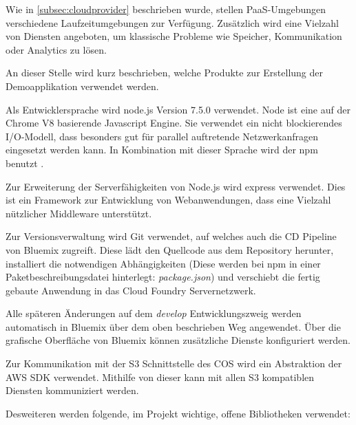Wie in \autoref{subsec:cloudprovider} beschrieben wurde, stellen \acs{PaaS}-Umgebungen verschiedene Laufzeitumgebungen zur Verfügung. Zusätzlich wird eine Vielzahl von Diensten angeboten, um klassische Probleme wie Speicher, Kommunikation oder Analytics zu lösen.

An dieser Stelle wird kurz beschrieben, welche Produkte zur Erstellung der Demoapplikation verwendet werden. 

Als Entwicklersprache wird node.js Version 7.5.0 verwendet. Node ist eine auf der Chrome V8 basierende Javascript Engine. Sie verwendet ein nicht blockierendes I/O-Modell, dass besonders gut für parallel auftretende Netzwerkanfragen eingesetzt werden kann. In Kombination mit dieser Sprache wird der \ac{npm} benutzt \parencite{nodejs.2017}.

Zur Erweiterung der Serverfähigkeiten von Node.js wird express verwendet. Dies ist ein Framework zur Entwicklung von Webanwendungen, dass eine Vielzahl nützlicher Middleware unterstützt.

Zur Versionsverwaltung wird \gls{Git} verwendet, auf welches auch die \ac{CD} Pipeline von Bluemix zugreift. Diese lädt den Quellcode aus dem Repository herunter, installiert die notwendigen Abhängigkeiten (Diese werden bei \acs{npm} in einer Paketbeschreibungsdatei hinterlegt: \textit{package.json}) und verschiebt die fertig gebaute Anwendung in das Cloud Foundry Servernetzwerk.  

Alle späteren Änderungen auf dem \textit{develop} Entwicklungszweig werden automatisch in Bluemix über dem oben beschrieben Weg angewendet. Über die grafische Oberfläche von Bluemix können zusätzliche Dienste konfiguriert werden.

Zur Kommunikation mit der S3 Schnittstelle des \acs{COS} wird ein Abstraktion der \acs{AWS} \gls{SDK} verwendet. Mithilfe von dieser kann mit allen \acs{S3} kompatiblen Diensten kommuniziert werden.

Desweiteren werden folgende, im Projekt wichtige, offene Bibliotheken verwendet:

